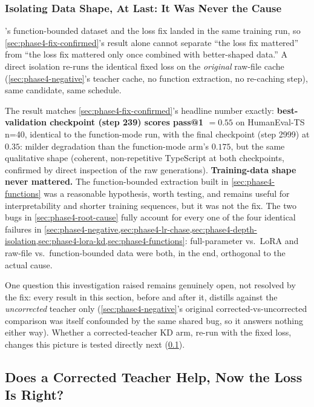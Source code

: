 \documentclass{article}
\theoremstyle{plain}
\theoremstyle{definition}
\theoremstyle{remark}
\begin{document}
\subsubsection{Isolating Data Shape, At Last: It Was Never the Cause}
\label{sec:phase4-rawfile-fixedloss}

's function-bounded dataset and the loss fix
landed in the same training run, so \cref{sec:phase4-fix-confirmed}'s
result alone cannot separate ``the loss fix mattered'' from ``the loss
fix mattered only once combined with better-shaped data.'' A direct
isolation re-runs the identical fixed loss on the \emph{original}
raw-file cache (\cref{sec:phase4-negative}'s teacher cache, no function
extraction, no re-caching step), same candidate, same schedule.

The result matches \cref{sec:phase4-fix-confirmed}'s headline number
exactly: \textbf{best-validation checkpoint (step 239) scores pass@1
$=0.55$} on HumanEval-TS n=40, identical to the function-mode run, with
the final checkpoint (step 2999) at $0.35$: milder degradation than
the function-mode arm's $0.175$, but the same qualitative shape
(coherent, non-repetitive TypeScript at both checkpoints, confirmed by
direct inspection of the raw generations). \textbf{Training-data shape
never mattered.} The function-bounded extraction built in
\cref{sec:phase4-functions} was a reasonable hypothesis, worth testing,
and remains useful for interpretability and shorter training sequences,
but it was not the fix. The two bugs in \cref{sec:phase4-root-cause}
fully account for every one of the four identical failures in
\cref{sec:phase4-negative,sec:phase4-lr-chase,sec:phase4-depth-isolation,sec:phase4-lora-kd,sec:phase4-functions}:
full-parameter vs.\ LoRA and raw-file vs.\ function-bounded data were
both, in the end, orthogonal to the actual cause.

One question this investigation raised remains genuinely open, not
resolved by the fix: every result in this section, before and after
it, distills against the \emph{uncorrected} teacher only
(\cref{sec:phase4-negative}'s original corrected-vs-uncorrected
comparison was itself confounded by the same shared bug, so it answers
nothing either way). Whether a corrected-teacher KD arm, re-run with
the fixed loss, changes this picture is tested directly next
(\cref{sec:phase4-correctedteacher-fixedloss}).


\subsection{Does a Corrected Teacher Help, Now the Loss Is Right?}
\label{sec:phase4-correctedteacher-fixedloss}
\end{document}

